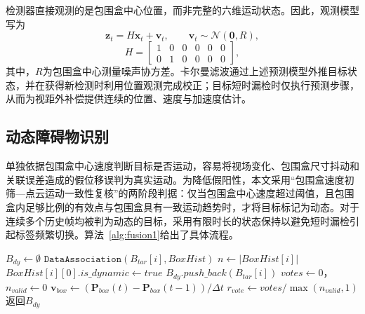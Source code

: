 检测器直接观测的是包围盒中心位置，而非完整的六维运动状态。因此，观测模型写为
\begin{equation}
    \mathbf{z}_t=H\mathbf{x}_t+\mathbf{v}_t,
    \qquad \mathbf{v}_t\sim\mathcal{N}(\mathbf{0},R),
    \label{eq:ca_observation}
\end{equation}
\begin{equation}
    H=\begin{bmatrix}1&0&0&0&0&0\\0&1&0&0&0&0\end{bmatrix},
    \label{eq:ca_observation_matrix}
\end{equation}
其中，$R$为包围盒中心测量噪声协方差。卡尔曼滤波通过上述预测模型外推目标状态，并在获得新检测时利用位置观测完成校正；目标短时漏检时仅执行预测步骤，从而为视距外补偿提供连续的位置、速度与加速度估计。

\subsection{动态障碍物识别}
单独依据包围盒中心速度判断目标是否运动，容易将视场变化、包围盒尺寸抖动和关联误差造成的假位移误判为真实运动。为降低假阳性，本文采用“包围盒速度初筛—点云运动一致性复核”的两阶段判据：仅当包围盒中心速度超过阈值，且包围盒内足够比例的有效点与包围盒具有一致运动趋势时，才将目标标记为动态。对于连续多个历史帧均被判为动态的目标，采用有限时长的状态保持以避免短时漏检引起标签频繁切换。算法~\ref{alg:fusion1}给出了具体流程。

\begin{algorithm}[H]
	\caption{动态障碍物检测分类算法}
	\label{alg:fusion1}
	\SetAlgoLined
	\LinesNumbered
	
	\BlankLine
	$B_{dy} \leftarrow \emptyset$\;
	 {
		$\texttt{DataAssociation}(B_{tar}[i], BoxHist)$ 
		$n \leftarrow |BoxHist[i]|$ 
		{
			$BoxHist[i][0].{is\_dynamic} \leftarrow {true}$\;
			$B_{dy}.{push\_back}(B_{tar}[i])$
			\Continue\;	
		}
		${votes} \leftarrow 0$，$n_{valid}\leftarrow0$
		$\mathbf{v}_{box}\leftarrow \left(\mathbf{P}_{box}(t)-\mathbf{P}_{box}(t-1)\right)/\Delta t$\;
		$r_{vote}\leftarrow votes/\max(n_{valid},1)$\;
	}	
	返回$B_{dy}$\;
\end{algorithm}

